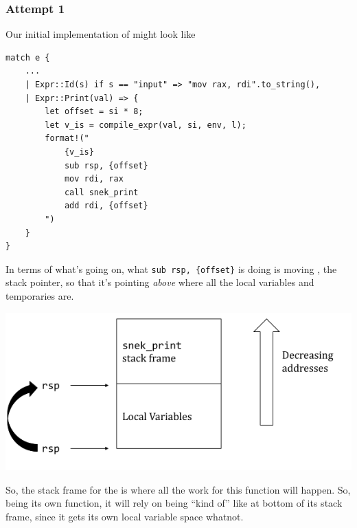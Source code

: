 \documentclass[letterpaper]{article}
\begin{document}
\subsubsection{Attempt 1}
Our initial implementation of  might look like 
\begin{verbatim}
match e {
    ... 
    | Expr::Id(s) if s == "input" => "mov rax, rdi".to_string(),
    | Expr::Print(val) => {
        let offset = si * 8; 
        let v_is = compile_expr(val, si, env, l);
        format!("
            {v_is}
            sub rsp, {offset}
            mov rdi, rax 
            call snek_print
            add rdi, {offset}
        ")
    }
}\end{verbatim}
In terms of what's going on, what \verb|sub rsp, {offset}| is doing is moving , the stack pointer, so that it's pointing \emph{above} where all the local variables and temporaries are.  
\begin{center}
    \includegraphics[scale=0.5]{../assets/rsp_offset_subtract.png}
\end{center}
So, the stack frame for the  is where all the work for this function will happen. So, being its own function, it will rely on  being ``kind of'' like at bottom of its stack frame, since it gets its own local variable space whatnot. 
\end{document}
